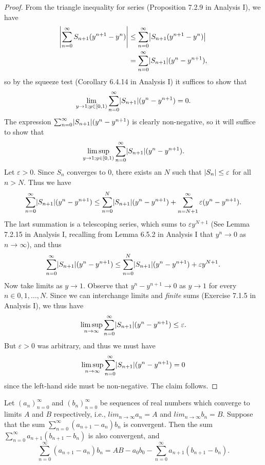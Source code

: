 \begin{proof}
    From the triangle inequality for series (Proposition 7.2.9 in Analysis I), we have
    \begin{align*}
        \abs*{\sum_{n = 0}^\infty S_{n + 1} (y^{n + 1} - y^n)} & \leq \sum_{n = 0}^\infty \abs*{S_{n + 1} (y^{n + 1} - y^n)} \\
                                                               & = \sum_{n = 0}^\infty \abs*{S_{n + 1}} (y^n - y^{n + 1}),
    \end{align*}
    so by the squeeze test (Corollary 6.4.14 in Analysis I) it suffices to show that
    \[
        \lim_{y \to 1 ; y \in [0, 1)} \sum_{n = 0}^\infty \abs*{S_{n + 1}} (y^n - y^{n + 1}) = 0.
    \]
    The expression \(\sum_{n = 0}^\infty \abs*{S_{n + 1}} (y^n - y^{n + 1})\) is clearly non-negative, so it will suffice to show that
    \[
        \limsup_{y \to 1 ; y \in [0, 1)} \sum_{n = 0}^\infty \abs*{S_{n + 1}} (y^n - y^{n + 1}).
    \]
    Let \(\varepsilon > 0\).
    Since \(S_n\) converges to \(0\), there exists an \(N\) such that \(\abs*{S_n} \leq \varepsilon\) for all \(n > N\).
    Thus we have
    \[
        \sum_{n = 0}^\infty \abs*{S_{n + 1}} (y^n - y^{n + 1}) \leq \sum_{n = 0}^N \abs*{S_{n + 1}} (y^n - y^{n + 1}) + \sum_{n = N + 1}^\infty \varepsilon (y^n - y^{n + 1}).
    \]
    The last summation is a telescoping series, which sums to \(\varepsilon y^{N + 1}\) (See Lemma 7.2.15 in Analysis I, recalling from Lemma 6.5.2 in Analysis I that \(y^n \to 0\) as \(n \to \infty\)), and thus
    \[
        \sum_{n = 0}^\infty \abs*{S_{n + 1}} (y^n - y^{n + 1}) \leq \sum_{n = 0}^N \abs*{S_{n + 1}} (y^n - y^{n + 1}) + \varepsilon y^{N + 1}.
    \]
    Now take limits as \(y \to 1\).
    Observe that \(y^n - y^{n + 1} \to 0\) as \(y \to 1\) for every \(n \in 0, 1, \dots, N\).
    Since we can interchange limits and \emph{finite} sums (Exercise 7.1.5 in Analysis I), we thus have
    \[
        \limsup_{n \to \infty} \sum_{n = 0}^\infty \abs*{S_{n + 1}} (y^n - y^{n + 1}) \leq \varepsilon.
    \]
    But \(\varepsilon > 0\) was arbitrary, and thus we must have
    \[
        \limsup_{n \to \infty} \sum_{n = 0}^\infty \abs*{S_{n + 1}} (y^n - y^{n + 1}) = 0
    \]
    since the left-hand side must be non-negative.
    The claim follows.
\end{proof}

\begin{lemma}\label{4.3.2}
    Let \((a_n)_{n = 0}^\infty\) and \((b_n)_{n = 0}^\infty\) be sequences of real numbers which converge to limits \(A\) and \(B\) respectively, i.e., \(lim_{n \to \infty} a_n = A\) and \(lim_{n \to \infty} b_n = B\).
    Suppose that the sum \(\sum_{n = 0}^\infty (a_{n + 1} - a_n) b_n\) is convergent.
    Then the sum \(\sum_{n = 0}^\infty a_{n + 1} (b_{n + 1} - b_n)\) is also convergent, and
    \[
        \sum_{n = 0}^\infty (a_{n + 1} - a_n) b_n = AB - a_0 b_0 - \sum_{n = 0}^\infty a_{n + 1} (b_{n + 1} - b_n).
    \]
\end{lemma}

